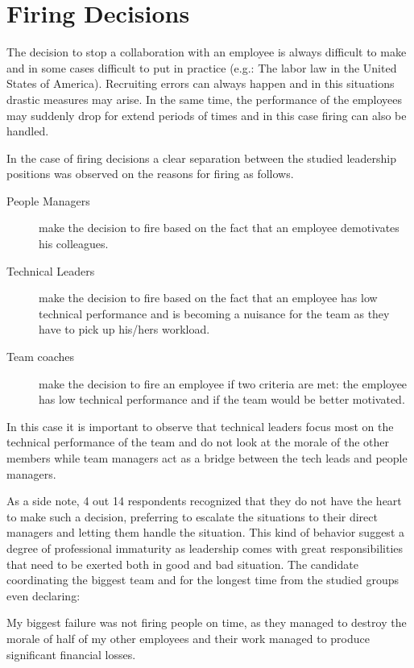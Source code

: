 \section{Firing Decisions}
\label{sec:firing}

The decision to stop a collaboration with an employee is always difficult to make and in some cases difficult to put in practice (e.g.: The labor law in the United States of America). Recruiting errors can always happen and in this situations drastic measures may arise. In the same time, the performance of the employees may suddenly drop for extend periods of times and in this case firing can also be handled. 

In the case of firing decisions a clear separation between the studied leadership positions was observed on the reasons for firing as follows.

\begin{description}
\item [People Managers] make the decision to fire based on the fact that an employee demotivates his colleagues.
\item [Technical Leaders] make the decision to fire based on the fact that an employee has low technical performance and is becoming a nuisance for the team as they have to pick up his/hers workload.
\item [Team coaches] make the decision to fire an employee if two criteria are met: the employee has low technical performance and if the team would be better motivated.
\end{description}

In this case it is important to observe that technical leaders focus most on the technical performance of the team and do not look at the morale of the other members while team managers act as a bridge between the tech leads and people managers. 

As a side note, 4 out 14 respondents recognized that they do not have the heart to make such a decision, preferring to escalate the situations to their direct managers and letting them handle the situation. This kind of behavior suggest a degree of professional immaturity as leadership comes with great responsibilities that need to be exerted both in good and bad situation. The candidate coordinating the biggest team and for the longest time from the studied groups even declaring:

\begin{displayquote}
My biggest failure was not firing people on time, as they managed to destroy the morale of half of my other employees and their work managed to produce significant financial losses.
\end{displayquote}

